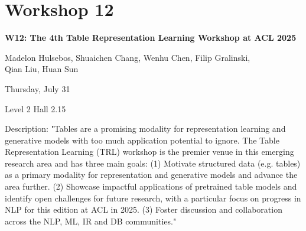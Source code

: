 \clearpage



\section[W12: The 4th Table Representation Learning \\
Workshop at ACL 2025]{Workshop 12}
\label{workshop_12}

\begin{center}
    {\Large \textbf{W12: The 4th Table Representation Learning Workshop at ACL 2025}}\\
    
 \vspace{5mm}

   Madelon Hulsebos, Shuaichen Chang, Wenhu Chen, Filip Gralinski, \\
   Qian Liu, Huan Sun\\

    \vspace{5mm}

    Thursday, July 31
    
   Level 2 Hall 2.15

\end{center}

Description: "Tables are a promising modality for representation learning and generative models with too much application potential to ignore. The Table Representation Learning (TRL) workshop is the premier venue in this emerging research area and has three main goals:
(1) Motivate structured data (e.g. tables) as a primary modality for representation and generative models and advance the area further.
(2) Showcase impactful applications of pretrained table models and identify open challenges for future research, with a particular focus on progress in NLP for this edition at ACL in 2025.
(3) Foster discussion and collaboration across the NLP, ML, IR and DB communities."


